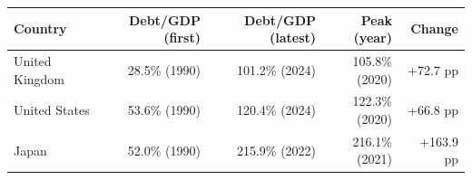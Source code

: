 \begin{tabular}{lrrrr}
\toprule
Country & Debt/GDP (first) & Debt/GDP (latest) & Peak (year) & Change \\
\midrule
United Kingdom & 28.5\% (1990) & 101.2\% (2024) & 105.8\% (2020) & +72.7 pp \\
United States & 53.6\% (1990) & 120.4\% (2024) & 122.3\% (2020) & +66.8 pp \\
Japan & 52.0\% (1990) & 215.9\% (2022) & 216.1\% (2021) & +163.9 pp \\
\bottomrule
\end{tabular}
